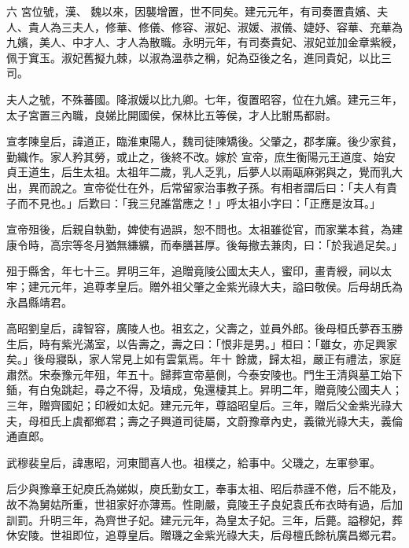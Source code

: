 
\begin{pinyinscope}

 六
 宮位號，漢、
 魏以來，因襲增置，世不同矣。建元元年，有司奏置貴嬪、夫人、貴人為三夫人，修華、修儀、修容、淑妃、淑媛、淑儀、婕妤、容華、充華為九嬪，美人、中才人、才人為散職。永明元年，有司奏貴妃、淑妃並加金章紫綬，佩于窴玉。淑妃舊擬九棘，以淑為溫恭之稱，妃為亞後之名，進同貴妃，以比三司。



 夫人之號，不殊蕃國。降淑媛以比九卿。七年，復置昭容，位在九嬪。建元三年，太子宮置三內職，良娣比開國侯，保林比五等侯，才人比駙馬都尉。



 宣孝陳皇后，諱道正，臨淮東陽人，魏司徒陳矯後。父肇之，郡孝廉。後少家貧，勤織作。家人矜其勞，或止之，後終不改。嫁於
 宣帝，庶生衡陽元王道度、始安貞王道生，后生太祖。太祖年二歲，乳人乏乳，后夢人以兩甌麻粥與之，覺而乳大出，異而說之。宣帝從仕在外，后常留家治事教子孫。有相者謂后曰：「夫人有貴子而不見也。」后歎曰：「我三兒誰當應之！」呼太祖小字曰：「正應是汝耳。」



 宣帝殂後，后親自執勤，婢使有過誤，恕不問也。太祖雖從官，而家業本貧，為建康令時，高宗等冬月猶無縑纊，而奉膳甚厚。後每撤去兼肉，曰：「於我過足矣。」



 殂于縣舍，年七十三。昇明三年，追贈竟陵公國太夫人，蜜印，畫青綬，祠以太牢；建元元年，追尊孝皇后。贈外祖父肇之金紫光祿大夫，謚曰敬侯。后母胡氏為永昌縣靖君。



 高昭劉皇后，諱智容，廣陵人也。祖玄之，父壽之，並員外郎。後母桓氏夢吞玉勝生后，時有紫光滿室，以告壽之，壽之曰：「恨非是男。」桓曰：「雖女，亦足興家矣。」後母寢臥，家人常見上如有雲氣焉。年十
 餘歲，歸太祖，嚴正有禮法，家庭肅然。宋泰豫元年殂，年五十。歸葬宣帝墓側，今泰安陵也。門生王清與墓工始下鍤，有白兔跳起，尋之不得，及墳成，兔還棲其上。昇明二年，贈竟陵公國夫人；三年，贈齊國妃；印綬如太妃。建元元年，尊謚昭皇后。三年，贈后父金紫光祿大夫，母桓氏上虞都鄉君；壽之子興道司徒屬，文蔚豫章內史，義徽光祿大夫，義倫通直郎。



 武穆裴皇后，諱惠昭，河東聞喜人也。祖樸之，給事中。父璣之，左軍參軍。



 后少與豫章王妃庾氏為娣姒，庾氏勤女工，奉事太祖、昭后恭謹不倦，后不能及，故不為舅姑所重，世祖家好亦薄焉。性剛嚴，竟陵王子良妃袁氏布衣時有過，后加訓罰。升明三年，為齊世子妃。建元元年，為皇太子妃。三年，后薨。謚穆妃，葬休安陵。世祖即位，追尊皇后。贈璣之金紫光祿大夫，后母檀氏餘杭廣昌鄉元君。




\end{pinyinscope}
